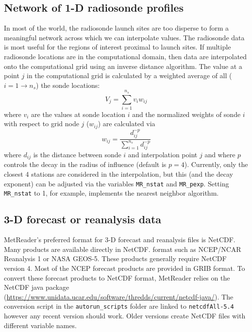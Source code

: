 \documentclass[11pt]{article}   %
\begin{document}
\subsection{Network of 1-D radiosonde profiles}
In most of the world, the radiosonde launch sites are too disperse to form
a meaningful network across which we can interpolate values.  The radiosonde
data is most useful for the regions of interest proximal to launch sites.
If multiple radiosonde locations are in the computational domain, then data
are interpolated onto the computational grid using an inverse distance
algorithm.  The value at a point $j$ in the computational grid is calculated
by a weighted average of all ($i=1\rightarrow n_s$) the sonde locations:
\begin{equation*}
V_j = \sum_{i=1}^{n_s} v_i w_{ij}
\end{equation*}
where $v_i$ are the values at sonde location $i$ and the normalized weights of
sonde $i$ with respect to grid node $j$ ($w_{ij}$) are calculated via
\begin{equation*}
w_{ij} = \frac{d_{ij}^{-p}}{\sum_{i=1}^{n_s} d_{ij}^{-p}}
\end{equation*}
where $d_{ij}$ is the distance between sonde $i$ and interpolation point $j$
and where $p$ controls
the decay in the radius of influence (default is $p=4$).  Currently, only the closest
4 stations are considered in the interpolation, but this (and the decay exponent) can
be adjusted via the variables \texttt{MR\_nstat} and \texttt{MR\_pexp}.  Setting
\texttt{MR\_nstat} to 1, for example, implements the nearest neighbor algorithm.

\subsection{3-D forecast or reanalysis data}
MetReader's preferred format for 3-D forecast and reanalysis files is NetCDF.  Many
products are available directly in NetCDF. format such as NCEP/NCAR Reanalysis 1 or
NASA GEOS-5.  These products generally require NetCDF version 4.  Most of the NCEP
forecast products are provided in GRIB format.  To convert these forecast products
to NetCDF format, MetReader relies on the NetCDF java package\\
(\url{https://www.unidata.ucar.edu/software/thredds/current/netcdf-java/}).  The
conversion script in the \texttt{autorun\_scripts} folder are linked to \texttt{netcdfAll-5.4}
however any recent version should work.  Older versions create NetCDF files with
different variable names.
\end{document}

